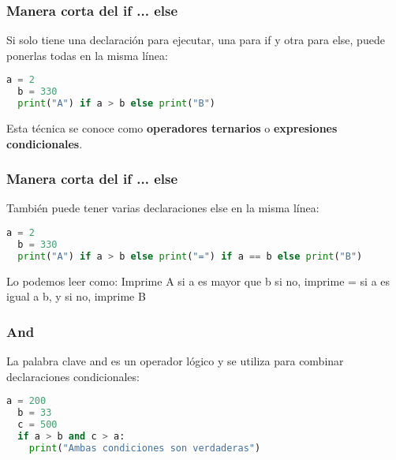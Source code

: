 \begin{frame}[fragile]
  \frametitle{Manera corta del if ... else}

  Si solo tiene una declaración para ejecutar, una para if y otra para
  else, puede ponerlas todas en la misma línea:

  \vspace{\baselineskip}
  \begin{lstlisting}[language=Python]
  a = 2
  b = 330
  print("A") if a > b else print("B")
  \end{lstlisting}

  \vspace{\baselineskip}
  \begin{exampleblock}{}
    Esta técnica se conoce como \textbf{operadores ternarios} o
    \textbf{expresiones condicionales}.
  \end{exampleblock}
\end{frame}

\begin{frame}[fragile]
  \frametitle{Manera corta del if ... else}

  También puede tener varias declaraciones else en la misma línea:

  \vspace{\baselineskip}
  \begin{lstlisting}[language=Python]
  a = 2
  b = 330
  print("A") if a > b else print("=") if a == b else print("B")
  \end{lstlisting}

  \vspace{\baselineskip}
  \begin{block}{Lo podemos leer como:}
    Imprime A si a es mayor que b si no, imprime = si a es igual a b, y si
    no, imprime B
  \end{block}
\end{frame}

\begin{frame}[fragile]
  \frametitle{And}

  La palabra clave \textcolor{codeKeyword}{and} es un operador lógico y
  se utiliza para combinar declaraciones condicionales:

  \vspace{\baselineskip}
  \begin{lstlisting}[language=Python]
  a = 200
  b = 33
  c = 500
  if a > b and c > a:
    print("Ambas condiciones son verdaderas")
  \end{lstlisting}
\end{frame}


